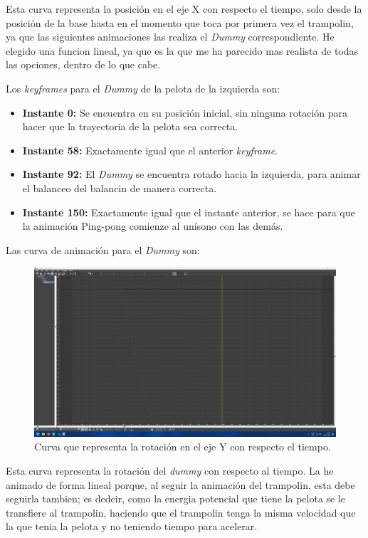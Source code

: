 \documentclass{article}
\begin{document}
Esta curva representa la posición en el eje X con respecto el tiempo, solo desde la posición de la base hasta en el momento que toca por primera vez el trampolin, ya que las siguientes animaciones las realiza el \textit{Dummy} correspondiente. He elegido una funcion lineal, ya que es la que me ha parecido mas realista de todas las opciones, dentro de lo que cabe. 


Los \textit{keyframes} para el \textit{Dummy} de la pelota de la izquierda son:

\begin{itemize}
    \item \textbf{Instante 0: }Se encuentra en su posición inicial, sin ninguna rotación para hacer que la trayectoria de la pelota sea correcta.
    \item \textbf{Instante 58: }Exactamente igual que el anterior \textit{keyframe}.
    \item \textbf{Instante 92: }El \textit{Dummy} se encuentra rotado hacia la izquierda, para animar el balanceo del balancin de manera correcta.
    \item \textbf{Instante 150: }Exactamente igual que el instante anterior, se hace para que la animación Ping-pong comienze al unísono con las demás.
\end{itemize}

Las curva de animación para el \textit{Dummy} son:

\begin{figure}[H]
    \centering
    \includegraphics[width=\textwidth]{imagenes/curvas/PL/dummy/green.png}
    \caption{Curva que representa la rotación en el eje Y con respecto el tiempo.}
 \end{figure}

Esta curva representa la rotación del \textit{dummy} con respecto al tiempo. La he animado de forma lineal porque, al seguir la animación del trampolin, esta debe seguirla tambien; es dedcir, como la energia potencial que tiene la pelota se le transfiere al trampolin, haciendo que el trampolin tenga la misma velocidad que la que tenia la pelota y no teniendo tiempo para acelerar.
\end{document}
